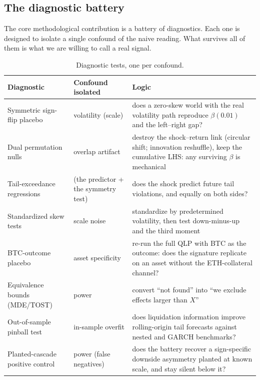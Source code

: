 \subsection{The diagnostic battery}
\label{sec:method-battery}

The core methodological contribution is a battery of diagnostics. Each one is
designed to isolate a single confound of the naive reading. What survives all
of them is what we are willing to call a real signal.

\begin{table}[t]
\centering
\caption{Diagnostic tests, one per confound.}
\label{tab:battery}
{\small
\begin{tabular}{p{}p{}p{}}
\toprule
Diagnostic & Confound isolated & Logic \\
\midrule
Symmetric sign-flip placebo & volatility (scale) & does a zero-skew world
with the real volatility path reproduce $\beta(0.01)$ and the left--right
gap? \citep{wu1986,liu1988,davidson2008,carriero2024} \\
Dual permutation nulls & overlap artifact & destroy the shock--return link
(circular shift; innovation reshuffle), keep the cumulative LHS: any
surviving $\beta$ is mechanical \citep{hodrick1992,boudoukh2008,valkanov2003} \\
Tail-exceedance regressions & (the predictor + the symmetry test) & does
the shock predict future tail violations, and equally on both sides?
\citep{engle2004,balcilar2017} \\
Standardized skew tests & scale noise & standardize by predetermined volatility, then
test down-minus-up and the third moment \citep{neuberger2021,farago2023} \\
BTC-outcome placebo & asset specificity & re-run the full QLP with BTC as
the outcome: does the signature replicate on an asset without the
ETH-collateral channel? \\
Equivalence bounds (MDE/TOST) & power & convert ``not found'' into ``we
exclude effects larger than $X$''
\citep{altman1995,ioannidis2017,lakens2017,riesthuis2024} \\
Out-of-sample pinball test & in-sample overfit & does liquidation
information improve rolling-origin tail forecasts against nested and
GARCH benchmarks? \citep{diebold1995} \\
Planted-cascade positive control & power (false negatives) & does the
battery recover a sign-specific downside asymmetry planted at known scale,
and stay silent below it? \\
\bottomrule
\end{tabular}}
\end{table}

